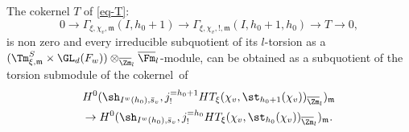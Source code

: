 \begin{lemma} \label{lem-important}
The cokernel $T$ of \eqref{eq-T}:\vspace*{-3pt}
\[
0 \to \Gamma_{\xi,\chi_v,\mathfrak m}(I,h_0+1)
\to \Gamma_{\xi,\chi_v,!,\mathfrak m}
(I,h_0+1,h_0) \to T \to 0,
\]
is non zero and every irreducible subquotient of its $l$-torsion as a
$(\Tm_{\xi,\mathfrak m}^S \times\nobreak \GL_d(F_w)) \otimes_{\overline \Zm_l} \overline \Fm_l$-module,
can be obtained as a subquotient of the torsion submodule of
the cokernel~of\vspace*{-3pt}
\begin{multline} \label{eq-torsion-trop2}
H^{0}(\sh_{I^w(h_0),\bar s_v},j^{=h_0+1}_!
HT_\xi(\chi_v,\st_{h_0+1}(\chi_v))_{\overline \Zm_l})_{\mathfrak m} \\
\to H^0(\sh_{I^w(h_0),\bar s_v},j^{=h_0}_!
HT_\xi(\chi_v,\st_{h_0}(\chi_v))_{\overline \Zm_l})_{\mathfrak m}.
\end{multline}
\end{lemma}

